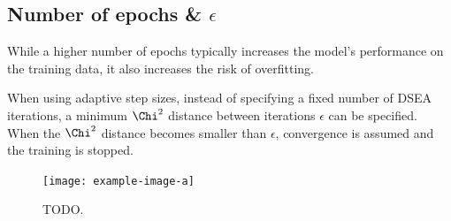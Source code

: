 \subsection{Number of epochs \& $\epsilon$}
While a higher number of epochs typically increases the model's performance on the training data,
it also increases the risk of overfitting.


When using adaptive step sizes,
instead of specifying a fixed number of DSEA iterations,
a minimum $\Chi^2$ distance between iterations $\epsilon$
can be specified.
When the $\Chi^2$ distance becomes smaller than $\epsilon$,
convergence is assumed and the training is stopped.

\begin{figure}
  \centering
  \texttt{[image: example-image-a]}
  \caption{TODO.}
  \label{fig:hyperparameter:TODO}
\end{figure}
